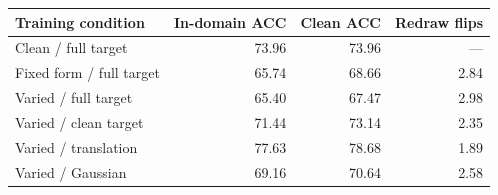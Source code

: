 \begin{tabular}{lrrr}
\toprule
Training condition & In-domain ACC & Clean ACC & Redraw flips\\
\midrule
Clean / full target & 73.96 & 73.96 & ---\\
Fixed form / full target & 65.74 & 68.66 & 2.84\\
Varied / full target & 65.40 & 67.47 & 2.98\\
Varied / clean target & 71.44 & 73.14 & 2.35\\
Varied / translation & 77.63 & 78.68 & 1.89\\
Varied / Gaussian & 69.16 & 70.64 & 2.58\\
\bottomrule
\end{tabular}
